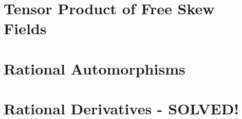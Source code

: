\documentclass[letterpaper,reqno]{amsart}
\numberwithin{equation}{section}
\begin{document}
\section{Tensor Product of Free Skew Fields}
	\label{sec:TPFSF}






\bigskip

\section{Rational Automorphisms}
	\label{sec:RatAuts}








\bigskip

\section{Rational Derivatives - {\color{red} SOLVED!}}
	\label{sec:RatDeriv}
	

\end{document}
